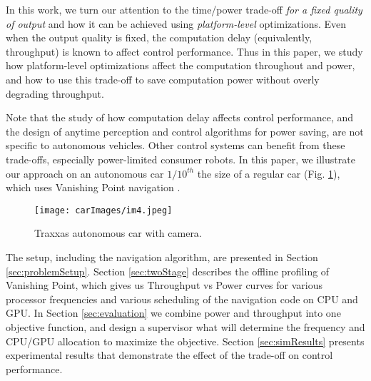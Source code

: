 In this work, we turn our attention to the time/power trade-off \emph{for a fixed quality of output} and how it can be achieved using \emph{platform-level} optimizations.
Even when the output quality is fixed, the computation delay (equivalently, throughput) is known to affect control performance. 
Thus in this paper, we study how platform-level optimizations affect the computation throughout and power, and how to use this trade-off to save computation power without overly degrading throughput.

Note that the study of how computation delay affects control performance, and the design of anytime perception and control algorithms for power saving, are not specific to autonomous vehicles.
Other control systems can benefit from these trade-offs, especially power-limited consumer robots.
In this paper, we illustrate our approach on an autonomous car $1/10^{th}$ the size of a regular car (Fig. \ref{fig:traxxas}), which uses Vanishing Point navigation \cite{VP1}.
\begin{figure}[t]
	\centering
	\texttt{[image: carImages/im4.jpeg]}
	\caption{Traxxas autonomous car with camera.}
		\label{fig:traxxas}
\end{figure}  
The setup, including the navigation algorithm, are presented in Section \ref{sec:problemSetup}.
Section \ref{sec:twoStage} describes the offline profiling of Vanishing Point, which gives us Throughput vs Power curves for various processor frequencies and various scheduling of the navigation code on CPU and GPU.
In Section \ref{sec:evaluation} we combine power and throughput into one objective function, and design a supervisor what will determine the frequency and CPU/GPU allocation to maximize the objective.
Section \ref{sec:simResults} presents experimental results that demonstrate the effect of the trade-off on control performance.
%
%
%
